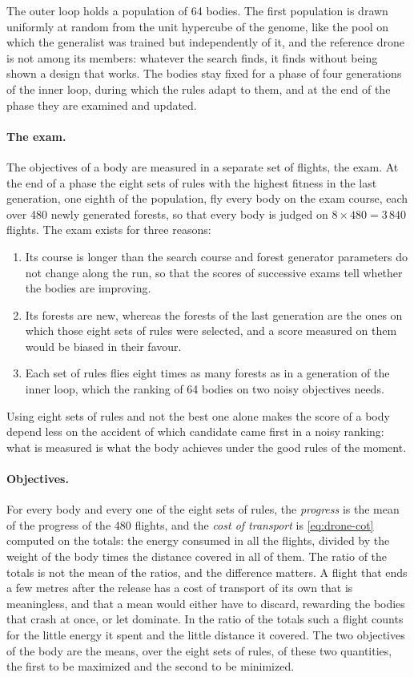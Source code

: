 The outer loop holds a population of 64 bodies. The first population is drawn uniformly at random from the unit hypercube of the genome, like the pool on which the generalist was trained but independently of it, and the reference drone is not among its members: whatever the search finds, it finds without being shown a design that works. The bodies stay fixed for a phase of four generations of the inner loop, during which the rules adapt to them, and at the end of the phase they are examined and updated.

\paragraph{The exam.} The objectives of a body are measured in a separate set of flights, the exam. At the end of a phase the eight sets of rules with the highest fitness in the last generation, one eighth of the population, fly every body on the exam course, each over 480 newly generated forests, so that every body is judged on $8 \times 480 = 3\,840$ flights. The exam exists for three reasons: 

\begin{enumerate}
  \item Its course is longer than the search course and forest generator parameters do not change along the run, so that the scores of successive exams tell whether the bodies are improving.
  \item Its forests are new, whereas the forests of the last generation are the ones on which those eight sets of rules were selected, and a score measured on them would be biased in their favour.
  \item Each set of rules flies eight times as many forests as in a generation of the inner loop, which the ranking of 64 bodies on two noisy objectives needs.
\end{enumerate}

Using eight sets of rules and not the best one alone makes the score of a body depend less on the accident of which candidate came first in a noisy ranking: what is measured is what the body achieves under the good rules of the moment.

\paragraph{Objectives.} For every body and every one of the eight sets of rules, the \emph{progress} is the mean of the progress of the 480 flights, and the \emph{cost of transport} is \eqref{eq:drone-cot} computed on the totals: the energy consumed in all the flights, divided by the weight of the body times the distance covered in all of them. The ratio of the totals is not the mean of the ratios, and the difference matters. A flight that ends a few metres after the release has a cost of transport of its own that is meaningless, and that a mean would either have to discard, rewarding the bodies that crash at once, or let dominate. In the ratio of the totals such a flight counts for the little energy it spent and the little distance it covered. The two objectives of the body are the means, over the eight sets of rules, of these two quantities, the first to be maximized and the second to be minimized.

